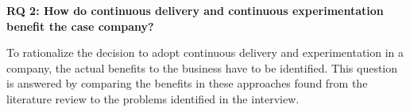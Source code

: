 \documentclass[english]{tktltiki2}
\theoremstyle{definition}
\theoremstyle{remark}
\begin{document}



\noindent \textbf{RQ 2: How do continuous delivery and continuous experimentation benefit the case company?} %

\noindent To rationalize the decision to adopt continuous delivery and experimentation in a company, the actual benefits to the business have to be identified. This question is answered by comparing the benefits in these approaches found from the literature review to the problems identified in the interview. 

\newline



\end{document}
